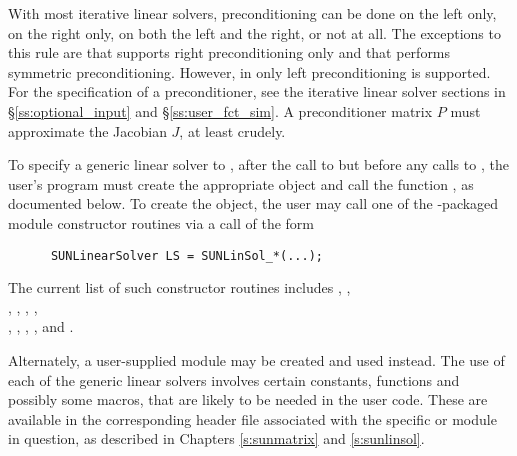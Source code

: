 With most iterative linear solvers, preconditioning can be done on the
left only, on the right only, on both the left and the right, or not
at all.  The exceptions to this rule are {\spfgmr} that supports right
preconditioning only and {\pcg} that performs symmetric
preconditioning.  However, in {\idas} only left preconditioning is
supported.  For the specification of a preconditioner, see the
iterative linear solver sections in \S\ref{ss:optional_input} and
\S\ref{ss:user_fct_sim}. A preconditioner matrix $P$ must approximate
the Jacobian $J$, at least crudely.

To specify a generic linear solver to {\idas}, after the call to
 but before any calls to , the user's
program must create the appropriate {\sunlinsol} object and call
the function , as documented below.
To create the  object, the user may call one of
the {\sundials}-packaged {\sunlinsol} module constructor routines via
a call of the form

\begin{verbatim}
      SUNLinearSolver LS = SUNLinSol_*(...);
\end{verbatim}

The current list of such constructor routines includes
,
,\\ \noindent
{},
,
,
,\\ \noindent
{},
,
,
, and
.

Alternately, a user-supplied
 module may be created and used instead.  The use
of each of the generic linear solvers involves certain constants,
functions and possibly some macros, that are likely to be needed in
the user code.  These are available in the corresponding header file
associated with the specific {\sunmatrix} or {\sunlinsol} module in
question, as described in Chapters \ref{s:sunmatrix} and
\ref{s:sunlinsol}.

